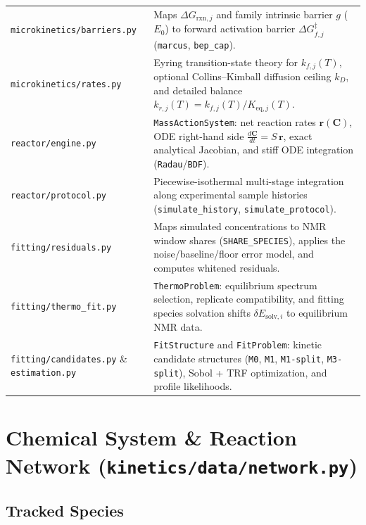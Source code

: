 \documentclass[11pt,a4paper]{article}
\let\origsection\section
\renewcommand{\section}{\clearpage\origsection}
\begin{document}
\begin{tabularx}{\textwidth}{L{4.9cm} Y}
\texttt{microkinetics/\allowbreak{}barriers.py} & Maps $\Delta G_{\text{rxn}, j}$ and family intrinsic barrier $g$ ($E_0$) to forward activation barrier $\Delta G_{f,j}^\ddagger$ (\texttt{marcus}, \texttt{bep\_\allowbreak{}cap}). \\[3pt]
\texttt{microkinetics/\allowbreak{}rates.py} & Eyring transition-state theory for $k_{f,j}(T)$, optional Collins--Kimball diffusion ceiling $k_D$, and detailed balance $k_{r,j}(T) = k_{f,j}(T)/K_{\text{eq}, j}(T)$. \\[3pt]
\texttt{reactor/\allowbreak{}engine.py} & \texttt{MassActionSystem}: net reaction rates $\mathbf{r}(\mathbf{C})$, ODE right-hand side $\frac{d\mathbf{C}}{dt} = S\,\mathbf{r}$, exact analytical Jacobian, and stiff ODE integration (\texttt{Radau}/\texttt{BDF}). \\[3pt]
\texttt{reactor/\allowbreak{}protocol.py} & Piecewise-isothermal multi-stage integration along experimental sample histories (\texttt{simulate\_\allowbreak{}history}, \texttt{simulate\_\allowbreak{}protocol}). \\[3pt]
\texttt{fitting/\allowbreak{}residuals.py} & Maps simulated concentrations to NMR window shares (\texttt{SHARE\_\allowbreak{}SPECIES}), applies the noise/baseline/floor error model, and computes whitened residuals. \\[3pt]
\texttt{fitting/\allowbreak{}thermo\_\allowbreak{}fit.py} & \texttt{ThermoProblem}: equilibrium spectrum selection, replicate compatibility, and fitting species solvation shifts $\delta E_{\text{solv}, i}$ to equilibrium NMR data. \\[3pt]
\texttt{fitting/\allowbreak{}candidates.py} \& \texttt{estimation.py} & \texttt{FitStructure} and \texttt{FitProblem}: kinetic candidate structures (\texttt{M0}, \texttt{M1}, \texttt{M1-split}, \texttt{M3-split}), Sobol + TRF optimization, and profile likelihoods. \\
\bottomrule
\end{tabularx}


\section{Chemical System \& Reaction Network (\texttt{kinetics/\allowbreak{}data/\allowbreak{}network.py})}

\subsection{Tracked Species}
\end{document}
